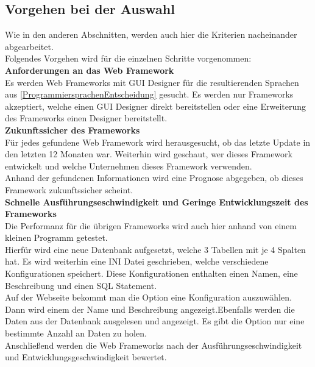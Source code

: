 \documentclass[ngerman]{article}
\begin{document}
    \subsection{Vorgehen bei der Auswahl}
    Wie in den anderen Abschnitten, werden auch hier die Kriterien nacheinander abgearbeitet.\\
    Folgendes Vorgehen wird für die einzelnen Schritte vorgenommen:\\
    \textbf{Anforderungen an das Web Framework}\\
    Es werden Web Frameworks mit GUI Designer für die resultierenden Sprachen aus \ref{ProgrammiersprachenEntscheidung} gesucht. Es werden nur Frameworks akzeptiert, welche einen GUI Designer direkt bereitstellen oder eine Erweiterung des Frameworks einen Designer bereitstellt.\\
    \textbf{Zukunftssicher des Frameworks}\\
    Für jedes gefundene Web Framework wird herausgesucht, ob das letzte Update in den letzten 12 Monaten war. Weiterhin wird geschaut, wer dieses Framework entwickelt und welche Unternehmen dieses Framework verwenden.\\
    Anhand der gefundenen Informationen wird eine Prognose abgegeben, ob dieses Framework zukunftssicher scheint.\\
    \textbf{Schnelle Ausführungseschwindigkeit und Geringe Entwicklungszeit des Frameworks}\\
    Die Performanz für die übrigen Frameworks wird auch hier anhand von einem kleinen Programm getestet.\\
    Hierfür wird eine neue Datenbank aufgesetzt, welche 3 Tabellen mit je 4 Spalten hat. Es wird weiterhin eine INI Datei geschrieben, welche verschiedene Konfigurationen speichert. Diese Konfigurationen enthalten einen Namen, eine Beschreibung und einen SQL Statement.\\
    Auf der Webseite bekommt man die Option eine Konfiguration auszuwählen. Dann wird einem der Name und Beschreibung angezeigt.Ebenfalls werden die Daten aus der Datenbank ausgelesen und angezeigt. Es gibt die Option nur eine bestimmte Anzahl an Daten zu holen.\\
    Anschließend werden die Web Frameworks nach der Ausführungseschwindigkeit und Entwicklungsgeschwindigkeit bewertet.
\end{document}
